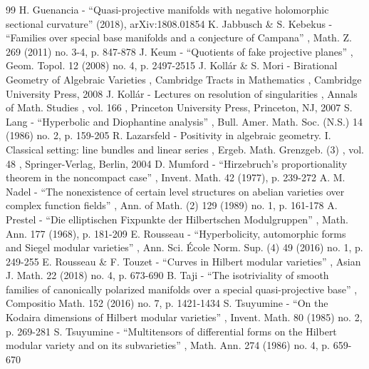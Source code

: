 \documentclass[10pt]{amsart}
\theoremstyle{plain}
\theoremstyle{definition}
\numberwithin{equation}{theorem}
\begin{document}
\begin{thebibliography}{99}
 H. Guenancia - “Quasi-projective manifolds with negative holomorphic sectional curvature” (2018), arXiv:1808.01854
 K. Jabbusch \& S. Kebekus - “Families over special base manifolds and a conjecture of Campana” , Math. Z. 269 (2011) no. 3-4, p. 847-878
 J. Keum - “Quotients of fake projective planes” , Geom. Topol. 12 (2008) no. 4, p. 2497-2515
 J. Kollár \& S. Mori - Birational Geometry of Algebraic Varieties , Cambridge Tracts in Mathematics , Cambridge University Press, 2008
 J. Kollár - Lectures on resolution of singularities , Annals of Math. Studies , vol. 166 , Princeton University Press, Princeton, NJ, 2007
 S. Lang - “Hyperbolic and Diophantine analysis” , Bull. Amer. Math. Soc. (N.S.) 14 (1986) no. 2, p. 159-205
 R. Lazarsfeld - Positivity in algebraic geometry. I. Classical setting: line bundles and linear series , Ergeb. Math. Grenzgeb. (3) , vol. 48 , Springer-Verlag, Berlin, 2004
 D. Mumford - “Hirzebruch’s proportionality theorem in the noncompact case” , Invent. Math. 42 (1977), p. 239-272
 A. M. Nadel - “The nonexistence of certain level structures on abelian varieties over complex function fields” , Ann. of Math. (2) 129 (1989) no. 1, p. 161-178
 A. Prestel - “Die elliptischen Fixpunkte der Hilbertschen Modulgruppen” , Math. Ann. 177 (1968), p. 181-209
 E. Rousseau - “Hyperbolicity, automorphic forms and Siegel modular varieties” , Ann. Sci. École Norm. Sup. (4) 49 (2016) no. 1, p. 249-255
 E. Rousseau \& F. Touzet - “Curves in Hilbert modular varieties” , Asian J. Math. 22 (2018) no. 4, p. 673-690
 B. Taji - “The isotriviality of smooth families of canonically polarized manifolds over a special quasi-projective base” , Compositio Math. 152 (2016) no. 7, p. 1421-1434
 S. Tsuyumine - “On the Kodaira dimensions of Hilbert modular varieties” , Invent. Math. 80 (1985) no. 2, p. 269-281
 S. Tsuyumine - “Multitensors of differential forms on the Hilbert modular variety and on its subvarieties” , Math. Ann. 274 (1986) no. 4, p. 659-670
\end{thebibliography}
\end{document}
